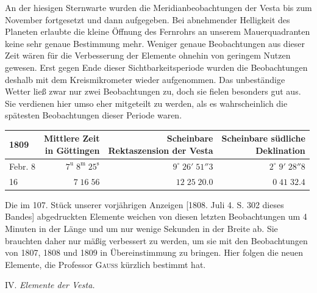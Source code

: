 \par\indent An der hiesigen Sternwarte wurden die Meridianbeobachtungen der Vesta bis zum November fortgesetzt und dann aufgegeben. Bei abnehmender Helligkeit des Planeten erlaubte die kleine Öffnung des Fernrohrs an unserem Mauerquadranten keine sehr genaue Bestimmung mehr. Weniger genaue Beobachtungen aus dieser Zeit wären für die Verbesserung der Elemente ohnehin von geringem Nutzen gewesen. Erst gegen Ende dieser Sichtbarkeitsperiode wurden die Beobachtungen deshalb mit dem Kreismikrometer wieder aufgenommen. Das unbeständige Wetter ließ zwar nur zwei Beobachtungen zu, doch sie fielen besonders gut aus. Sie verdienen hier umso eher mitgeteilt zu werden, als es wahrscheinlich die spätesten Beobachtungen dieser Periode waren.


\begin{center}\fontsize{10}{12}\selectfont\setlength{\tabcolsep}{5pt}\renewcommand{\arraystretch}{1.15}\begin{tabular}{lrrr}
1809 & \shortstack{Mittlere Zeit\\in Göttingen} & \shortstack{Scheinbare\\Rektaszension der Vesta} & \shortstack{Scheinbare südliche\\Deklination}\\
\hline
Febr. 8 & $7^{\text{u}}\;8^{\text{m}}\;25^{\text{s}}$ & $9^\circ\;26'\;51''3$ & $2^\circ\;9'\;28''8$\\
16 & $7\;16\;56$ & $12\;25\;20.0$ & $0\;41\;32.4$\\
\end{tabular}\end{center}


\par\indent Die im 107. Stück unserer vorjährigen Anzeigen [1808. Juli 4. S. 302 dieses Bandes] abgedruckten Elemente weichen von diesen letzten Beobachtungen um 4 Minuten in der Länge und um nur wenige Sekunden in der Breite ab. Sie brauchten daher nur mäßig verbessert zu werden, um sie mit den Beobachtungen von 1807, 1808 und 1809 in Übereinstimmung zu bringen. Hier folgen die neuen Elemente, die Professor \textsc{Gauss} kürzlich bestimmt hat.



\begin{center}
IV. \emph{Elemente der Vesta.}
\end{center}


